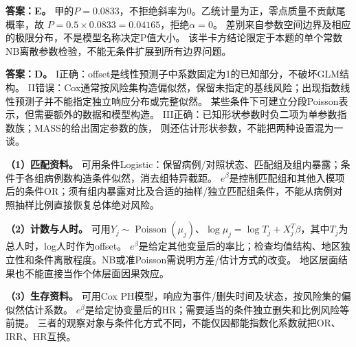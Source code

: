 \textbf{答案：E。} 甲的$P=0.0833$，不拒绝斜率为0。乙统计量为正，零点质量不贡献尾概率，故
$P=0.5\times0.0833=0.04165$，拒绝$\alpha=0$。
差别来自参数空间边界及相应的极限分布，不是模型名称决定P值大小。
该半卡方结论限定于本题的单个常数NB离散参数检验，不能无条件扩展到所有边界问题。
\par\nobreak\smallskip{}

\textbf{答案：D。} I正确：offset是线性预测子中系数固定为1的已知部分，不破坏GLM结构。
II错误：Cox通常按风险集构造偏似然，保留未指定的基线风险；出现指数线性预测子并不能指定独立响应分布或完整似然。
某些条件下可建立分段Poisson表示，但需要额外的数据和模型构造。
III正确：已知形状参数时负二项为单参数指数族；MASS的给出固定参数的族，
则还估计形状参数，不能把两种设置混为一谈。
\par\nobreak\smallskip{}

\textbf{（1）匹配资料。} 可用条件Logistic：保留病例/对照状态、匹配组及组内暴露；条件于各组病例数构造条件似然，消去组特异截距。
$e^\beta$是控制匹配组和其他入模项后的条件OR；须有组内暴露对比及合适的抽样/独立匹配组条件，不能从病例对照抽样比例直接恢复总体绝对风险。
\par\textbf{（2）计数与人时。} 可用$Y_j\sim\operatorname{Poisson}(\mu_j)$、$\log\mu_j=\log T_j+X_j^T\beta$，其中$T_j$为总人时，log人时作为offset。
$e^\beta$是给定其他变量后的率比；检查均值结构、地区独立性和条件离散程度。NB或准Poisson需说明方差/估计方式的改变。
地区层面结果也不能直接当作个体层面因果效应。
\par\textbf{（3）生存资料。} 可用Cox PH模型，响应为事件/删失时间及状态，按风险集的偏似然估计系数。
$e^\beta$是给定协变量后的HR；需要适当的条件独立删失和比例风险等前提。
三者的观察对象与条件化方式不同，不能仅因都能指数化系数就把OR、IRR、HR互换。
\par\nobreak\smallskip{}

